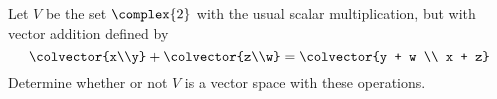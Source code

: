 %
Let $V$ be the set $\complex{2}$ with the usual scalar multiplication, but with vector addition defined by 
\begin{equation*}
\colvector{x\\y} + \colvector{z\\w} = \colvector{y + w \\ x + z}
\end{equation*}
Determine whether or not $V$ is a vector space with these operations. 
